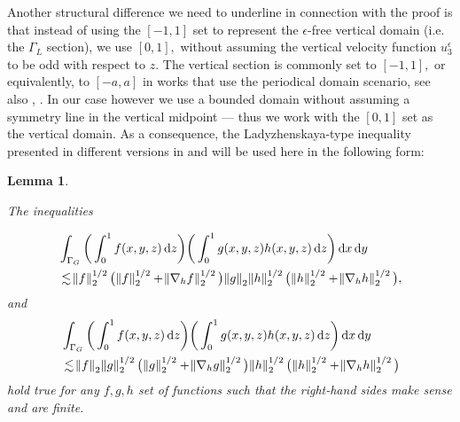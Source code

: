 \documentclass[11pt, a4paper]{article}
\newtheorem{lemma}{Lemma}
\newcommand*\diff{\mathop{}\!\mathrm{d}}
\begin{document}
Another structural difference we need to underline in connection with the proof is that instead of using the $[-1,1]$ set to represent the $\epsilon$-free vertical domain (i.e. the $\Gamma_L$ section), we use $[0,1],$ without assuming the vertical velocity function $u_3^\epsilon$ to be odd with respect to $z.$ The vertical section is commonly set to $[-1,1],$ or equivalently, to $[-a,a]$ in works that use the periodical domain scenario, see also \cite{cao2016global}, \cite{cao2017global}. In our case however we use a bounded domain without assuming a symmetry line in the vertical midpoint --- thus we work with the $[0,1]$ set as the vertical domain. As a consequence, the Ladyzhenskaya-type inequality presented in different versions in \cite{cao2003global} and \cite{li2019primitive} will be used here in the following form:

\begin{lemma}\label{LadyzhenskayatypeIEQ}

The inequalities

\begin{equation}\nonumber
\begin{split}
& \int_{\Gamma_G} \bigg ( \int_0^1 f(x,y,z) \diff z \bigg) \bigg ( \int_0^1 g(x,y,z) h(x,y,z) \diff z \bigg ) \diff x \diff y \\
& \lesssim \norm{f}_2^{1/2} \big ( \norm{f}_2^{1/2} + \norm{\nabla_h f}_2^{1/2} \big ) \norm{g}_2 \norm{h}_2^{1/2} \big (\norm{h}_2^{1/2} + \norm{\nabla_h h}_2^{1/2} \big ),
\end{split}
\end{equation}
%
and
%
\begin{equation}\nonumber
\begin{split}
& \int_{\Gamma_G} \bigg ( \int_0^1 f(x,y,z) \diff z \bigg) \bigg ( \int_0^1 g(x,y,z) h(x,y,z) \diff z \bigg ) \diff x \diff y \\
& \lesssim \norm{f}_2 \norm{g}_2^{1/2} \big ( \norm{g}_2^{1/2} + \norm{\nabla_h g}_2^{1/2} \big ) \norm{h}_2^{1/2} \big (\norm{h}_2^{1/2} + \norm{\nabla_h h}_2^{1/2} \big )
\end{split}
\end{equation}
%
hold true for any $f,g,h$ set of functions such that the right-hand sides make sense and are finite.

\end{lemma}

\end{document}

